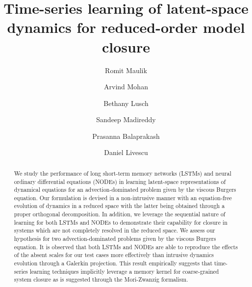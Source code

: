 \documentclass[preprint,12pt]{elsarticle}
\begin{document}
\begin{frontmatter}


\title{Time-series learning of latent-space dynamics for reduced-order model closure}


\author[label1]{Romit Maulik}
\author[label2]{Arvind Mohan}
\author[label1]{Bethany Lusch}
\author[label3]{Sandeep Madireddy}
\author[label1,label3]{Prasanna Balaprakash}
\author[label2]{Daniel Livescu}

\address[label1]{Argonne Leadership Computing Facility, Argonne National Laboratory, Lemont, IL 60439, USA}
\address[label2]{Center for Nonlinear Studies/CCS-2 Division, Los Alamos National Laboratory, Los Alamos, NM 87545, USA}
\address[label3]{Mathematics and Computer Science Division, Argonne National Laboratory, Lemont, IL 60439, USA}




\begin{abstract}
We study the performance of long short-term memory networks (LSTMs) and neural ordinary differential equations (NODEs) in learning latent-space representations of dynamical equations for an advection-dominated problem given by the viscous Burgers equation. Our formulation is devised in a non-intrusive manner with an equation-free evolution of dynamics in a reduced space with the latter being obtained through a proper orthogonal decomposition. In addition, we leverage the sequential nature of learning for both LSTMs and NODEs to demonstrate their capability for closure in systems which are not completely resolved in the reduced space. We assess our hypothesis for two advection-dominated problems given by the viscous Burgers equation. It is observed that both LSTMs and NODEs are able to reproduce the effects of the absent scales for our test cases more effectively than intrusive dynamics evolution through a Galerkin projection. This result empirically suggests that time-series learning techniques implicitly leverage a memory kernel for coarse-grained system closure as is suggested through the Mori-Zwanzig formalism.
\end{abstract}


\end{frontmatter}
\end{document}
